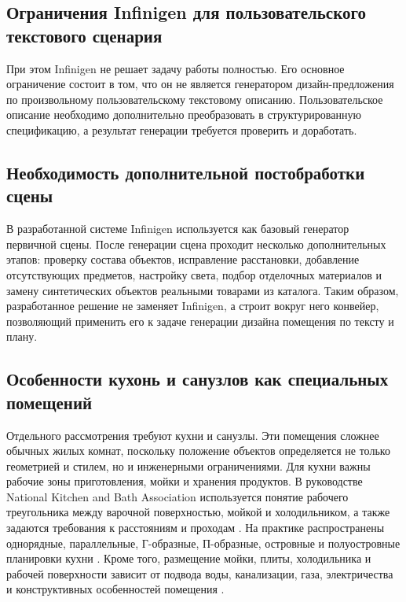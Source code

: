 \documentclass[times]{itmo-student-thesis}
\begin{document}
\subsection{Ограничения Infinigen для пользовательского текстового сценария}

При этом Infinigen не решает задачу работы полностью. Его основное ограничение состоит в том, что он не является генератором дизайн-предложения по произвольному пользовательскому текстовому описанию. Пользовательское описание необходимо дополнительно преобразовать в структурированную спецификацию, а результат генерации требуется проверить и доработать.

\subsection{Необходимость дополнительной постобработки сцены}

В разработанной системе Infinigen используется как базовый генератор первичной сцены. После генерации сцена проходит несколько дополнительных этапов: проверку состава объектов, исправление расстановки, добавление отсутствующих предметов, настройку света, подбор отделочных материалов и замену синтетических объектов реальными товарами из каталога. Таким образом, разработанное решение не заменяет Infinigen, а строит вокруг него конвейер, позволяющий применить его к задаче генерации дизайна помещения по тексту и плану.

\subsection{Особенности кухонь и санузлов как специальных помещений}

Отдельного рассмотрения требуют кухни и санузлы. Эти помещения сложнее обычных жилых комнат, поскольку положение объектов определяется не только геометрией и стилем, но и инженерными ограничениями. Для кухни важны рабочие зоны приготовления, мойки и хранения продуктов. В руководстве National Kitchen and Bath Association используется понятие рабочего треугольника между варочной поверхностью, мойкой и холодильником, а также задаются требования к расстояниям и проходам \cite{nkbaKitchenGuidelines}. На практике распространены однорядные, параллельные, Г-образные, П-образные, островные и полуостровные планировки кухни \cite{tomHowleyKitchenLayouts}. Кроме того, размещение мойки, плиты, холодильника и рабочей поверхности зависит от подвода воды, канализации, газа, электричества и конструктивных особенностей помещения \cite{reformCphKitchenLayout}.
\end{document}
